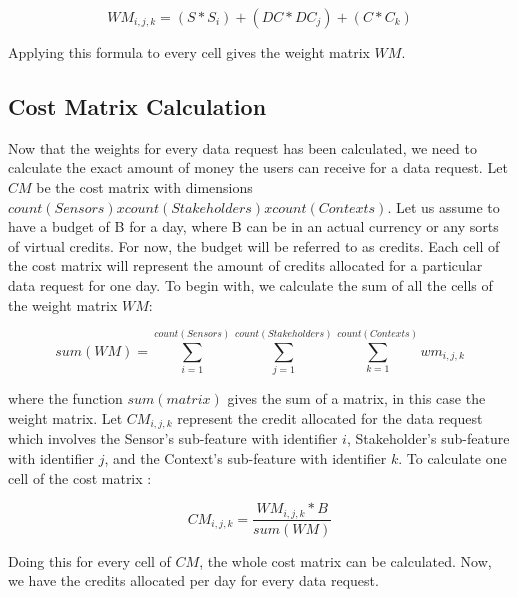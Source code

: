 \begin{equation}
WM_{i,j,k} = (S*S_{i}) + (DC*DC_{j}) + (C*C_{k})
\end{equation}

Applying this formula to every cell gives the weight matrix $WM$.

\subsection{Cost Matrix Calculation}

Now that the weights for every data request has been calculated, we need to calculate the exact amount of money
the users can receive for a data request. Let $CM$ be the cost matrix with dimensions $count(Sensors) x count(Stakeholders) x count(Contexts)$.
Let us assume to have a budget of B for a day, where
B can be in an actual currency or any sorts of virtual credits. For now, the budget will be referred to as credits. Each cell of the cost matrix will represent the amount of credits allocated for a particular data request for one day.
To begin with, we calculate the sum of all the cells of the weight matrix $WM$:

\begin{equation}
sum(WM) = \sum\limits_{i=1}^{count(Sensors)} \sum\limits_{j=1}^{count(Stakeholders)} \sum\limits_{k=1}^{count(Contexts)} wm_{i,j,k}
\end{equation}

where the function $sum(matrix)$ gives the sum of a matrix, in this case the weight matrix.
Let $CM_{i,j,k}$ represent the credit allocated for the data request which involves the Sensor's sub-feature with identifier $i$, Stakeholder's sub-feature with identifier $j$, and the Context's sub-feature with identifier $k$. To calculate one cell of the cost matrix :

\begin{equation}
CM_{i,j,k} = \frac{WM_{i,j,k} * B}{sum(WM)}
\end{equation}

Doing this for every cell of $CM$, the whole cost matrix can be calculated. Now, we have the credits allocated per day for every data
request.

